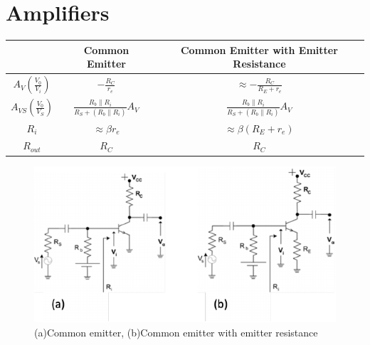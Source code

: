 \documentclass{article}
\begin{document}
\section{Amplifiers}
\begin{table}[H] \centering \large
\begin{tabular}{|c|c|c|}
\hline
& Common Emitter & Common Emitter with Emitter Resistance\\ \hline
$A_{V}(\frac{V_{0}}{V_{i}})$ & $-\frac{R_{C}}{r_{e}}$ & $\approx -\frac{R_{C}}{R_{E}+r_{e}}$ \\  [1.3ex]\hline
$A_{VS}(\frac{V_{0}}{V_{S}})$ & $\frac{R_{b}\parallel R_{i}}{R_{S}+(R_{b}\parallel R_{i})}A_{V}$ & $\frac{R_{b}\parallel R_{i}}{R_{S}+(R_{b}\parallel R_{i})}A_{V}$\\ [1.3ex] \hline
$R_{i}$ & $\approx \beta r_{e}$ & $\approx \beta (R_{E}+r_{e})$ \\ [1.3ex] \hline
$R_{out}$ & $R_{C}$ & $R_{C}$ \\ [1.3ex] \hline
\end{tabular}
\end{table}
\begin{figure}[H]\centering
\includegraphics[width=.6\textwidth]{amp.pdf}
\caption{(a)Common emitter, (b)Common emitter with emitter resistance }
\end{figure}
\end{document}
